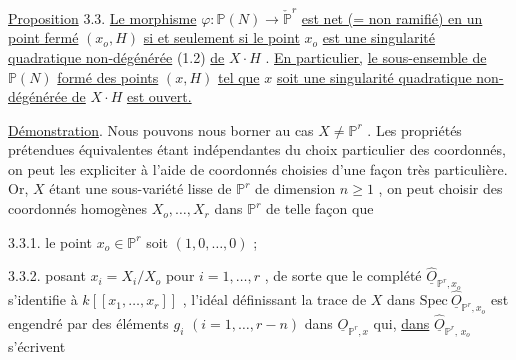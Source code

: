 \begin{center}
\end{center}
\underline{Proposition} 3.3. \underline{Le morphisme} $\varphi : \mathbb{P}(N) \longrightarrow \check{\mathbb{P}}^{r}$ \underline{est net (= non ramifié) en un point fermé} $(x_{o}, H)$ \underline{si et seulement si le point} $x_{o}$ \underline{est une singularité quadratique non-dégénérée} (1.2) \underline{de} $X \cdot H$ . \underline{En particulier,} \underline{le sous-ensemble de} $\mathbb{P}(N)$ \underline{formé des points} $(x, H)$ \underline{tel que} $x$ \underline{soit une singularité quadratique non-dégénérée de} $X \cdot H$ \underline{est ouvert.}



\underline{Démonstration}. Nous pouvons nous borner au cas $X \neq \mathbb{P}^r$ . Les propriétés prétendues équivalentes étant indépendantes du choix particulier des coordonnés, on peut les expliciter à l'aide de  coordonnés choisies d'une façon très particulière. Or, $X$ étant une sous-variété lisse de $\mathbb{P}^r$ de dimension $n \geq 1$ , on peut choisir des coordonnés homogènes $X_o,\dots,X_r$ dans $\mathbb{P}^r$ de telle façon que

3.3.1.  le point $x_o \in \mathbb{P}^r$ soit $(1, 0,\dots,0)$ ;

3.3.2.  posant $x_i = X_i/X_o$ pour $i = 1,\dots,r$ , de sorte que le complété $\hat{\underline{O}}_{\mathbb{P}^r,x_o}$ s'identifie à $k[[x_1,\dots,x_r]]$ , l'idéal définissant la trace de $X$ dans $\mathrm{Spec}\ \hat{\underline{O}}_{\mathbb{P}^r,x_o}$ est engendré par des éléments $g_i$ $(i=1,\dots,r-n)$ dans $\underline{O}_{\mathbb{P}^r,x}$ qui, \underline{dans} $\hat{\underline{O}}_{\mathbb{P}^r,\, x_o}$ s'écrivent

